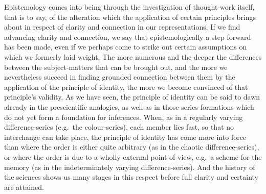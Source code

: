 \documentclass[12pt]{book}
\newcommand{\opage}[1]{\marginnote{\footnotesize\textit{[#1]}}}
\begin{document}
Epistemology comes into being through the investigation of thought-work itself,
that is to say, of the alteration which the application of certain principles
brings about in respect of clarity and connection in our representations. If we
find advancing clarity and connection, we say that epistemologically a step
forward has been made, even if we perhaps come to strike out certain assumptions
on which we formerly laid weight. The more numerous \opage{45}and the deeper the
differences between the subject-matters that can be brought out, and the more we
nevertheless succeed in finding grounded connection between them by the
application of the principle of identity, the more we become convinced of that
principle's validity. As we have seen, the principle of identity can be said to
dawn already in the prescientific analogies, as well as in those
series-formations which do not yet form a foundation for inferences. When, as in
a regularly varying difference-series (e.g.\ the colour-series), each member
lies fast, so that no interchange can take place, the principle of identity has
come more into force than where the order is either quite arbitrary (as in the
chaotic difference-series), or where the order is due to a wholly external point
of view, e.g.\ a scheme for the memory (as in the indeterminately varying
difference-series). And the history of the sciences shows us many stages in this
respect before full clarity and certainty are attained.
\end{document}
